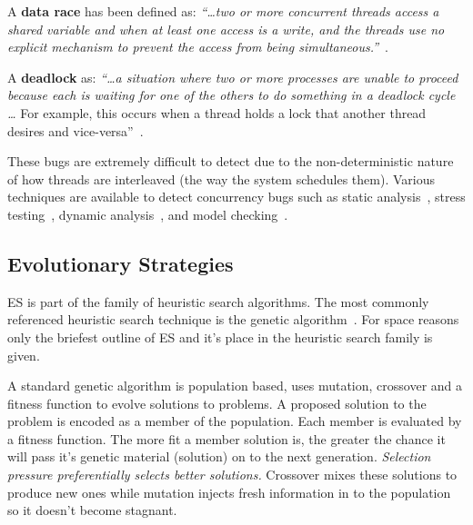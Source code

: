 \documentclass{llncs}
\begin{document}

A \textbf{data race} has been defined as: \textit{``\ldots two or more
concurrent threads access a shared variable and when at least one access is a
write, and the threads use no explicit mechanism to prevent the access from
being simultaneous.''}~\cite{LSW07}.

A \textbf{deadlock} as: \textit{``\ldots a situation where two or more
processes are unable to proceed because each is waiting for one of the others
to do something in a deadlock cycle \ldots} For example, this occurs when a
thread holds a lock that another thread desires and vice-versa''~\cite{LSW07}.

These bugs are extremely difficult to detect due to the non-deterministic
nature of how threads are interleaved (the way the system schedules them).
Various techniques are available to detect concurrency bugs such as static
analysis~\cite{NA07,NPSG09,HP04}, stress testing~\cite{HSU03}, dynamic
analysis~\cite{JNPS09,EFN+02}, and model
checking~\cite{BHPV00,RDH03,OM03,MQB07,Holz97,JM04,HP00}.

\subsection{Evolutionary Strategies}
\label{sec:evolutionary_strategies}

ES is part of the family of heuristic search algorithms. The most commonly
referenced heuristic search technique is the genetic algorithm~\cite{GA92}. For
space reasons only the briefest outline of ES and it's place in the heuristic
search family is given.

A standard genetic algorithm is population based, uses mutation, crossover and
a fitness function to evolve solutions to problems. A proposed solution to the
problem is encoded as a member of the population. Each member is evaluated by a
fitness function. The more fit a member solution is, the greater the chance it
will pass it's genetic material (solution) on to the next generation.
\textit{Selection pressure preferentially selects better solutions.} Crossover
mixes these solutions to produce new ones while mutation injects fresh
information in to the population so it doesn't become stagnant.
\end{document}

